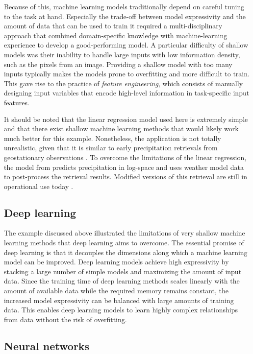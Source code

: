 Because of this, machine learning models traditionally depend on careful tuning
to the task at hand. Especially the trade-off between model expressivity and the
amount of data that can be used to train it required a multi-disciplinary
approach that combined domain-specific knowledge with machine-learning
experience to develop a good-performing model. A particular difficulty of
shallow models was their inability to handle large inputs with low information
density, such as the pixels from an image. Providing a shallow model with too
many inputs typically makes the models prone to overfitting and more difficult
to train. This gave rise to the practice of \textit{feature engineering}, which
consists of manually designing input variables that encode high-level
information in task-specific input features.

It should be noted that the linear regression model used here is extremely
simple and that there exist shallow machine learning methods that would likely
work much better for this example. Nonetheless, the application is not totally
unrealistic, given that it is similar to early precipitation retrievals from
geostationary observations \citep{vicente98}. To overcome the limitations of the
linear regression, the model from \citet{vicente98} predicts precipitation in
log-space and uses weather model data to post-process the retrieval results.
Modified versions of this retrieval are still in operational use today
\citep{siqueira19}.

\subsection{Deep learning}

The example discussed above illustrated the limitations of very shallow machine
learning methods that deep learning aims to overcome. The essential promise of
deep learning is that it decouples the dimensions along which a machine learning
model can be improved. Deep learning models achieve high expressivity by
stacking a large number of simple models and maximizing the amount of input
data. Since the training time of deep learning methods scales linearly with the
amount of available data while the required memory remains constant, the
increased model expressivity can be balanced with large amounts of training
data. This enables deep learning models to learn highly complex relationships
from data without the risk of overfitting.

  \subsection{Neural networks}

